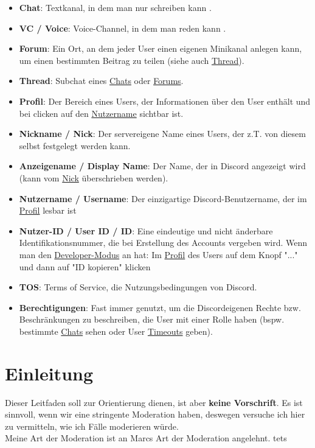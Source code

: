 \documentclass[a4paper,12pt]{article}
\begin{document}
\begin{itemize}
    \item \textbf{Chat}\hypertarget{term:chat}{}: Textkanal, in dem man nur schreiben kann .
    \item \textbf{VC / Voice}\hypertarget{term:vc}{}: Voice-Channel, in dem man reden kann .
    \item \textbf{Forum}\hypertarget{term:forum}{}: Ein Ort, an dem jeder User einen eigenen Minikanal anlegen kann, um einen bestimmten Beitrag zu teilen (siehe auch \hyperlink{term:thread}{Thread}).
    \item \textbf{Thread}\hypertarget{term:thread}{}: Subchat eines \hyperlink{term:chat}{Chats} oder \hyperlink{term:forum}{Forums}.
    \item \textbf{Profil}\hypertarget{term:profile}{}: Der Bereich eines Users, der Informationen über den User enthält und bei clicken auf den \hyperlink{term:username}{Nutzername} sichtbar ist.
    \item \textbf{Nickname / Nick}\hypertarget{term:nick}{}: Der servereigene Name eines Users, der z.T. von diesem selbst festgelegt werden kann.
    \item \textbf{Anzeigename / Display Name}\hypertarget{term:displayname}{}: Der Name, der in Discord angezeigt wird (kann vom \hyperlink{term:nick}{Nick} überschrieben werden).
    \item \textbf{Nutzername / Username}\hypertarget{term:username}{}: Der einzigartige Discord-Benutzername, der im \hyperlink{term:profile}{Profil} lesbar ist
    \item \textbf{Nutzer-ID / User ID / ID}\hypertarget{term:id}{}: Eine eindeutige und nicht änderbare Identifikationsnummer, die bei Erstellung des Accounts vergeben wird. Wenn man den \href{https://www.howtogeek.com/714348/how-to-enable-or-disable-developer-mode-on-discord/}{Developer-Modus} an hat: Im \hyperlink{term:profile}{Profil} des Users auf dem Knopf "..." und dann auf "ID kopieren" klicken
    \item \textbf{TOS}\hypertarget{term:tos}{}: Terms of Service, die Nutzungsbedingungen von Discord.
    \item \textbf{Berechtigungen}\hypertarget{term:berechtigungen}{}: Fast immer genutzt, um die Discordeigenen Rechte bzw. Beschränkungen zu beschreiben, die User mit einer Rolle haben (bspw. bestimmte \hyperlink{term:chat}{Chats} sehen oder User \hyperlink{term:to}{Timeouts} geben).
\end{itemize}

\section{Einleitung}
Dieser Leitfaden soll zur Orientierung dienen, ist aber \textbf{keine Vorschrift}. Es ist sinnvoll, wenn wir
eine stringente Moderation haben, deswegen versuche ich hier zu vermitteln, wie ich Fälle moderieren würde.\\
Meine Art der Moderation ist an Marcs Art der Moderation angelehnt.
tets
\end{document}

